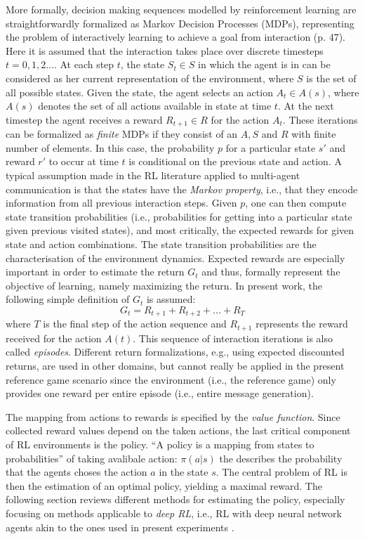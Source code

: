 More formally, decision making sequences modelled by reinforcement learning are straightforwardly formalized as Markov Decision Processes (MDPs), representing the problem of interactively learning to achieve a goal from interaction (p. 47). 
Here it is assumed that the interaction takes place over discrete timesteps $t = 0, 1,2 ...$. At each step $t$, the state $S_t \in S$ in which the agent is in can be considered as her current representation of the environment, where $S$ is the set of all possible states. Given the state, the agent selects an action $A_t \in A(s)$, where $A(s)$ denotes the set of all actions available in state at time $t$. At the next timestep the agent receives a reward $R_{t+1} \in R$ for the action $A_t$. These iterations can be formalized as \textit{finite} MDPs if they consist of an $A, S$ and $R$ with finite number of elements. In this case, the probability $p$ for a particular state $s'$ and reward $r'$ to occur at time $t$ is conditional on the previous state and action. A typical assumption made in the RL literature applied to multi-agent communication is that the states have the \textit{Markov property}, i.e., that they encode information from all previous interaction steps. 
Given $p$, one can then compute state transition probabilities (i.e., probabilities for getting into a particular state given previous visited states), and most critically, the expected rewards for given state and action combinations. The state transition probabilities are the characterisation of the environment dynamics.
Expected rewards are especially important in order to estimate the return $G_t$ and thus, formally represent the objective of learning, namely maximizing the return. In present work, the following simple definition of $G_t$ is assumed: 
$$G_t = R_{t+1} + R_{t+2} + ... + R_T$$ where $T$ is the final step of the action sequence and $R_{t+1}$ represents the reward received for the action $A(t)$. This sequence of interaction iterations is also called \textit{episodes}. Different return formalizations, e.g., using expected discounted returns, are used in other domains, but cannot really be applied in the present reference game scenario since the environment (i.e., the reference game) only provides one reward per entire episode (i.e., entire message generation). 

The mapping from actions to rewards is specified by the \textit{value function}. Since collected reward values depend on the taken actions, the last critical component of RL environments is the policy. ``A policy is a mapping from states to probabilities'' of taking avalibale action: $\pi(a | s)$ the describes the probability that the agents choses the action $a$ in the state $s$. The central problem of RL is then the estimation of an optimal policy, yielding a maximal reward. The following section reviews different methods for estimating the policy, especially focusing on methods applicable to \textit{deep RL}, i.e., RL with deep neural network agents akin to the ones used in present experiments \parencite{lecun2015deep}.



